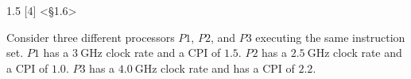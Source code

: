 \documentclass[paper=a4, fontsize=11pt]{scrartcl} %
\begin{document}
\maketitle %

\section{}

\begin{fancyquotes}
  1.5 [4] <§1.6>

  Consider three different processors $P1$, $P2$, and $P3$ executing
  the same instruction set. $P1$ has a $\SI{3}{\giga\hertz}$ clock
  rate and a CPI of $1.5$. $P2$ has a $\SI{2.5}{\giga\hertz}$ clock
  rate and a CPI of $1.0$. $P3$ has a $\SI{4.0}{\giga\hertz}$ clock
  rate and has a CPI of $2.2$.
 \end{fancyquotes}
\end{document}
